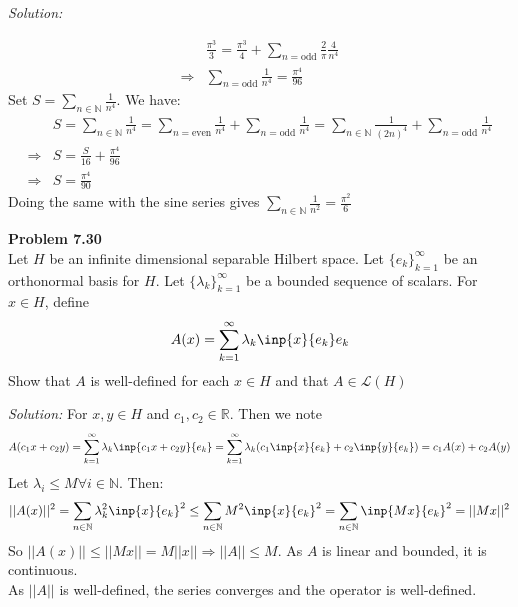 \documentclass[a4paper, 11pt]{article}
\newenvironment{problem}[2][Problem]
    { \begin{mdframed}[backgroundcolor=gray!20] \textbf{#1 #2} \\}
    {  \end{mdframed}}
\newenvironment{solution}
    {\textit{Solution:}}
    {}
\begin{document}
\begin{solution}
\begin{enumerate}
    \begin{align*}
        &\frac{\pi^3}{3}=\frac{\pi^3}{4}+\sum_{n=\text{odd}}\frac{2}{\pi}\frac{4}{n^4}\\
        \Rightarrow &\sum_{n=\text{odd}}\frac{1}{n^4}=\frac{\pi^4}{96}
    \end{align*}
    Set $S=\sum_{n\in\mathbb{N}}\frac{1}{n^4}$. We have:
    \begin{align*}
        &S=\sum_{n\in\mathbb{N}}\frac{1}{n^4}=\sum_{n=\text{even}}\frac{1}{n^4}+\sum_{n=\text{odd}}\frac{1}{n^4}=\sum_{n\in\mathbb N}\frac{1}{(2n)^4}+\sum_{n=\text{odd}}\frac{1}{n^4}\\
        \Rightarrow &S=\frac{S}{16}+\frac{\pi^4}{96}\\
        \Rightarrow &S=\frac{\pi^4}{90}
    \end{align*}
    Doing the same with the sine series gives $\sum_{n\in\mathbb N}\frac{1}{n^2}=\frac{\pi^2}{6}$
    \end{enumerate}
\end{solution}

\begin{problem}{7.30}
    Let $H$ be an infinite dimensional separable Hilbert space. Let $\{e_k\}_{k=1}^\infty$ be an orthonormal basis for $H$. Let $\{\lambda_k\}_{k=1}^\infty$ be a bounded sequence of scalars. For $x\in H$, define
    $$A(x)=\sum_{k=1}^\infty \lambda_k\inp{x}{e_k}e_k$$
    Show that $A$ is well-defined for each $x\in H$ and that $A\in\mathcal L(H)$
\end{problem}
\begin{solution}
    For $x,y\in H$ and $c_1,c_2\in \mathbb R$. Then we note
    \begin{align*}
        A(c_1x+c_2y)=\sum_{k=1}^\infty \lambda_k\inp{c_1x+c_2y}{e_k}=\sum_{k=1}^\infty \lambda_k(c_1\inp{x}{e_k}+c_2\inp{y}{e_k})=c_1A(x)+c_2A(y)
    \end{align*}
    Let $\lambda_i\leq M\forall i\in\mathbb N$. Then:
    $$||A(x)||^2=\sum_{n\in\mathbb N}\lambda _k^2\inp{x}{e_k}^2\leq \sum_{n\in\mathbb N}M^2\inp{x}{e_k}^2=\sum_{n\in\mathbb N}\inp{Mx}{e_k}^2=||Mx||^2$$
    So $||A(x)||\leq ||Mx||=M||x||\Rightarrow ||A||\leq M$. As $A$ is linear and bounded, it is continuous. \\
    As $||A||$ is well-defined, the series converges and the operator is well-defined. 
\end{solution}
\end{document}
